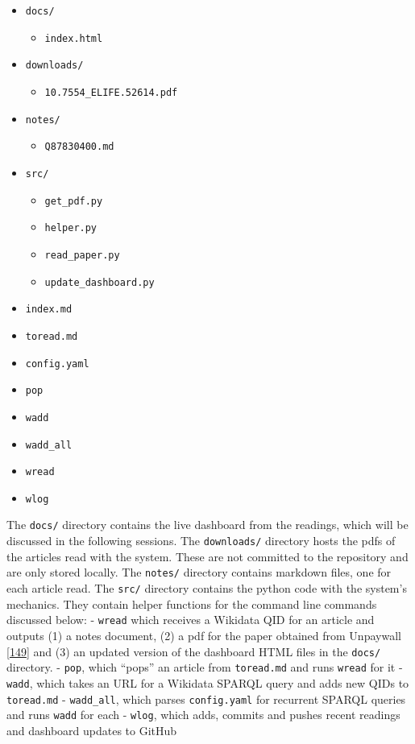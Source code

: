 \begin{itemize}
\tightlist
\item
  \texttt{docs/}

  \begin{itemize}
  \tightlist
  \item
    \texttt{index.html}
  \end{itemize}
\item
  \texttt{downloads/}

  \begin{itemize}
  \tightlist
  \item
    \texttt{10.7554\_ELIFE.52614.pdf}
  \end{itemize}
\item
  \texttt{notes/}

  \begin{itemize}
  \tightlist
  \item
    \texttt{Q87830400.md}
  \end{itemize}
\item
  \texttt{src/}

  \begin{itemize}
  \tightlist
  \item
    \texttt{get\_pdf.py}
  \item
    \texttt{helper.py}
  \item
    \texttt{read\_paper.py}
  \item
    \texttt{update\_dashboard.py}
  \end{itemize}
\item
  \texttt{index.md}
\item
  \texttt{toread.md}
\item
  \texttt{config.yaml}
\item
  \texttt{pop}
\item
  \texttt{wadd}
\item
  \texttt{wadd\_all}
\item
  \texttt{wread}
\item
  \texttt{wlog}
\end{itemize}

The \texttt{docs/} directory contains the live dashboard from the readings, which will be discussed in the following sessions.
The \texttt{downloads/} directory hosts the pdfs of the articles read with the system.
These are not committed to the repository and are only stored locally.
The \texttt{notes/} directory contains markdown files, one for each article read.
The \texttt{src/} directory contains the python code with the system's mechanics.
They contain helper functions for the command line commands discussed below:
- \texttt{wread} which receives a Wikidata QID for an article and outputs (1) a notes document, (2) a pdf for the paper obtained from Unpaywall {[}\protect\hyperlink{ref-15luL9zZC}{149}{]} and (3) an updated version of the dashboard HTML files in the \texttt{docs/} directory.
- \texttt{pop}, which ``pops'' an article from \texttt{toread.md} and runs \texttt{wread} for it
- \texttt{wadd}, which takes an URL for a Wikidata SPARQL query and adds new QIDs to \texttt{toread.md}
- \texttt{wadd\_all}, which parses \texttt{config.yaml} for recurrent SPARQL queries and runs \texttt{wadd} for each
- \texttt{wlog}, which adds, commits and pushes recent readings and dashboard updates to GitHub

